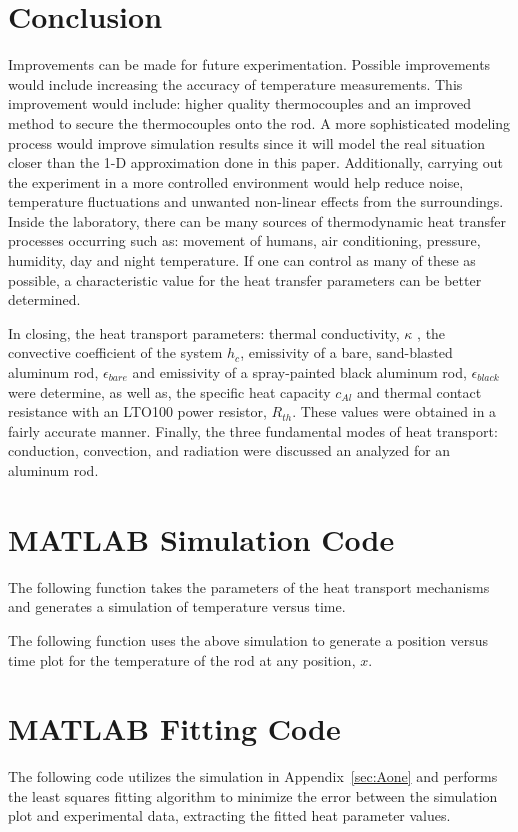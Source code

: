 \documentclass[10pt,aps,prb,twocolumn, nofootinbib]{revtex4-1}
\begin{document}
 
\section{\label{sec:four}Conclusion}

Improvements can be made for future experimentation. Possible improvements would include increasing the accuracy of temperature measurements. This improvement would include: higher quality thermocouples and an improved method to secure the thermocouples onto the rod. A more sophisticated modeling process would improve simulation results since it will model the real situation closer than the 1-D approximation done in this paper. Additionally, carrying out the experiment in a more controlled environment would help reduce noise, temperature fluctuations and unwanted non-linear effects from the surroundings. Inside the laboratory, there can be many sources of thermodynamic heat transfer processes occurring such as: movement of humans, air conditioning, pressure, humidity, day and night temperature. If one can control as many of these as possible, a characteristic value for the heat transfer parameters can be better determined.

In closing, the heat transport parameters: thermal conductivity, $\kappa$ , the convective coefficient of the system $h_c$, emissivity of a bare, sand-blasted aluminum rod, $\epsilon_{bare}$ and emissivity of a spray-painted black aluminum rod, $\epsilon_{black}$ were determine, as well as, the specific heat capacity $c_{Al}$ and thermal contact resistance with an LTO100 power resistor, $R_{th}$. These values were obtained in a fairly accurate manner. Finally, the three fundamental modes of heat transport: conduction, convection, and radiation were discussed an analyzed for an aluminum rod.

\appendix
\section{\label{sec:Aone}MATLAB Simulation Code}
The following function takes the parameters of the heat transport mechanisms and generates a simulation of temperature versus time. 

\newpage
The following function uses the above simulation to generate a position versus time plot for the temperature of the rod at any position, $x$.

\section{\label{sec:Atwo}MATLAB Fitting Code}
The following code utilizes the simulation in Appendix~\ref{sec:Aone} and performs the least squares fitting algorithm to minimize the error between the simulation plot and experimental data, extracting the fitted heat parameter values.



\end{document}
